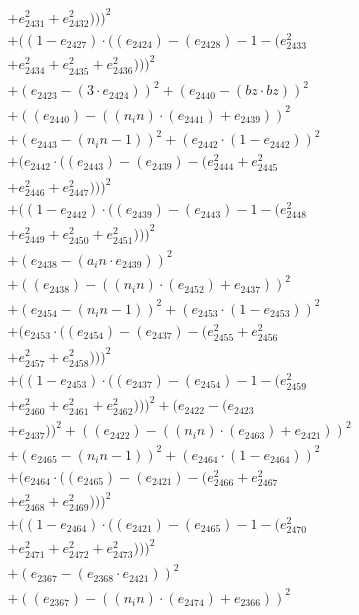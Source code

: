 \documentclass[10pt, a4paper]{article}
\begin{document}
\begin{align*}
& + e_{2431}^{2} + e_{2432}^{2})))^{2} \\
& + ((1 - e_{2427})  \cdot  ((e_{2424}) - (e_{2428}) - 1 - (e_{2433}^{2} \\
& + e_{2434}^{2} + e_{2435}^{2} + e_{2436}^{2})))^{2} \\
& + (e_{2423} - (3  \cdot  e_{2424}))^{2} + (e_{2440} - (bz  \cdot  bz))^{2} \\
& + ((e_{2440}) - ((n_in)  \cdot  (e_{2441}) + e_{2439}))^{2} \\
& + (e_{2443} - (n_in - 1))^{2} + (e_{2442}  \cdot  (1 - e_{2442}))^{2} \\
& + (e_{2442}  \cdot  ((e_{2443}) - (e_{2439}) - (e_{2444}^{2} + e_{2445}^{2} \\
& + e_{2446}^{2} + e_{2447}^{2})))^{2} \\
& + ((1 - e_{2442})  \cdot  ((e_{2439}) - (e_{2443}) - 1 - (e_{2448}^{2} \\
& + e_{2449}^{2} + e_{2450}^{2} + e_{2451}^{2})))^{2} \\
& + (e_{2438} - (a_in  \cdot  e_{2439}))^{2} \\
& + ((e_{2438}) - ((n_in)  \cdot  (e_{2452}) + e_{2437}))^{2} \\
& + (e_{2454} - (n_in - 1))^{2} + (e_{2453}  \cdot  (1 - e_{2453}))^{2} \\
& + (e_{2453}  \cdot  ((e_{2454}) - (e_{2437}) - (e_{2455}^{2} + e_{2456}^{2} \\
& + e_{2457}^{2} + e_{2458}^{2})))^{2} \\
& + ((1 - e_{2453})  \cdot  ((e_{2437}) - (e_{2454}) - 1 - (e_{2459}^{2} \\
& + e_{2460}^{2} + e_{2461}^{2} + e_{2462}^{2})))^{2} + (e_{2422} - (e_{2423} \\
& + e_{2437}))^{2} + ((e_{2422}) - ((n_in)  \cdot  (e_{2463}) + e_{2421}))^{2} \\
& + (e_{2465} - (n_in - 1))^{2} + (e_{2464}  \cdot  (1 - e_{2464}))^{2} \\
& + (e_{2464}  \cdot  ((e_{2465}) - (e_{2421}) - (e_{2466}^{2} + e_{2467}^{2} \\
& + e_{2468}^{2} + e_{2469}^{2})))^{2} \\
& + ((1 - e_{2464})  \cdot  ((e_{2421}) - (e_{2465}) - 1 - (e_{2470}^{2} \\
& + e_{2471}^{2} + e_{2472}^{2} + e_{2473}^{2})))^{2} \\
& + (e_{2367} - (e_{2368}  \cdot  e_{2421}))^{2} \\
& + ((e_{2367}) - ((n_in)  \cdot  (e_{2474}) + e_{2366}))^{2} \\

\end{align*}
\end{document}
